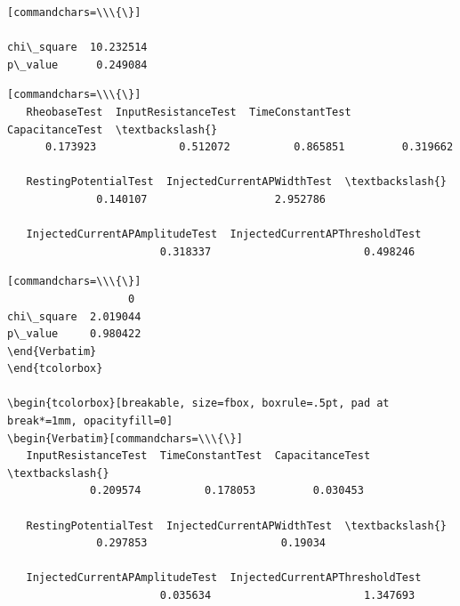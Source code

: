 \begin{verbatim}[commandchars=\\\{\}]
                    
chi\_square  10.232514
p\_value      0.249084
\end{verbatim}

\begin{verbatim}[commandchars=\\\{\}]
   RheobaseTest  InputResistanceTest  TimeConstantTest  CapacitanceTest  \textbackslash{}
      0.173923             0.512072          0.865851         0.319662

   RestingPotentialTest  InjectedCurrentAPWidthTest  \textbackslash{}
              0.140107                    2.952786

   InjectedCurrentAPAmplitudeTest  InjectedCurrentAPThresholdTest
                        0.318337                        0.498246
\end{verbatim}

\begin{verbatim}[commandchars=\\\{\}]
                   0
chi\_square  2.019044
p\_value     0.980422
\end{Verbatim}
\end{tcolorbox}
        
\begin{tcolorbox}[breakable, size=fbox, boxrule=.5pt, pad at break*=1mm, opacityfill=0]
\begin{Verbatim}[commandchars=\\\{\}]
   InputResistanceTest  TimeConstantTest  CapacitanceTest  \textbackslash{}
             0.209574          0.178053         0.030453

   RestingPotentialTest  InjectedCurrentAPWidthTest  \textbackslash{}
              0.297853                     0.19034

   InjectedCurrentAPAmplitudeTest  InjectedCurrentAPThresholdTest
                        0.035634                        1.347693
\end{verbatim}

